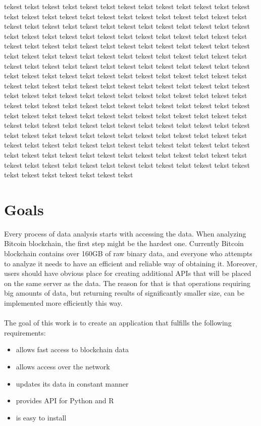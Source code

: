 \documentclass[12pt, en, eng, oneside]{mgr}
\begin{document}
tekest tekst tekest tekst tekest tekst tekest tekst tekest tekst tekest tekst tekest tekst tekest tekst tekest tekst tekest tekst tekest tekst tekest tekst tekest tekst tekest tekst tekest tekst tekest tekst tekest tekst tekest tekst tekest tekst tekest tekst tekest tekst tekest tekst tekest tekst tekest tekst tekest tekst tekest tekst tekest tekst tekest tekst tekest tekst tekest tekst tekest tekst tekest tekst tekest tekst tekest tekst tekest tekst tekest tekst tekest tekst tekest tekst tekest tekst tekest tekst tekest tekst tekest tekst tekest tekst tekest tekst tekest tekst tekest tekst tekest tekst tekest tekst tekest tekst tekest tekst tekest tekst tekest tekst tekest tekst tekest tekst tekest tekst tekest tekst tekest tekst tekest tekst tekest tekst tekest tekst tekest tekst tekest tekst tekest tekst tekest tekst tekest tekst tekest tekst tekest tekst tekest tekst tekest tekst tekest tekst tekest tekst tekest tekst tekest tekst tekest tekst tekest tekst tekest tekst tekest tekst tekest tekst tekest tekst tekest tekst tekest tekst tekest tekst tekest tekst tekest tekst tekest tekst tekest tekst tekest tekst tekest tekst tekest tekst tekest tekst tekest tekst tekest tekst tekest tekst tekest tekst tekest tekst tekest tekst tekest tekst tekest tekst tekest tekst tekest tekst tekest tekst tekest tekst tekest tekst tekest tekst tekest tekst tekest tekst tekest tekst tekest tekst tekest tekst tekest tekst tekest tekst tekest tekst tekest tekst tekest tekst 

\chapter{Goals}

Every process of data analysis starts with accessing the data. When analyzing Bitcoin blockchain, the first step might be the hardest one. Currently Bitcoin blockchain contains over 160GB of raw binary data, and everyone who attempts to analyze it needs to have an efficient and reliable way of obtaining it. Moreover, users should have obvious place for creating additional APIs that will be placed on the same server as the data. The reason for that is that operations requiring big amounts of data, but returning results of significantly smaller size, can be implemented more efficiently this way.
\\
\\
The goal of this work is to create an application that fulfills the following requirements: 
\begin{itemize}

\item
allows fast access to blockchain data
\item
allows access over the network
\item
updates its data in constant manner
\item
provides API for Python and R
\item
is easy to install

\end{itemize}
\end{document}

